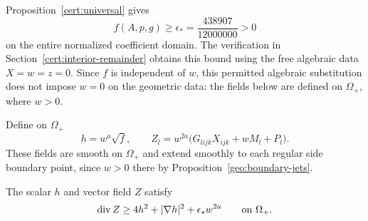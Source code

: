 Proposition~\ref{cert:universal} gives
\begin{equation}\label{flux:f-positive}
 f(A,p,g)\geq\epsilon_*
   =\frac{438907}{12000000}>0
\end{equation}
on the entire normalized coefficient domain.  The verification in
Section~\ref{cert:interior-remainder} obtains this bound using the free
algebraic data
$X=w=z=0$.  Since $f$ is independent of $w$, this permitted algebraic
substitution does not impose $w=0$ on the geometric data: the fields
below are defined on $\Omega_+$, where $w>0$.

Define on $\Omega_+$
\begin{equation}\label{flux:fields}
 h=w^a\sqrt f,\qquad
 Z_l=w^{2a}\bigl(G_{lijk}X_{ijk}+wM_l+P_l\bigr).
\end{equation}
These fields are smooth on $\Omega_+$ and extend smoothly to each
regular side boundary point, since $w>0$ there by
Proposition~\ref{geo:boundary-jets}.

\begin{proposition}\label{flux:interior-comparison}
The scalar $h$ and vector field $Z$ satisfy
\begin{equation}\label{flux:interior-inequality}
 \operatorname{div} Z\geq 4h^2+|\nabla h|^2+\epsilon_*w^{2a}
 \qquad\text{on }\Omega_+.
\end{equation}
\end{proposition}

